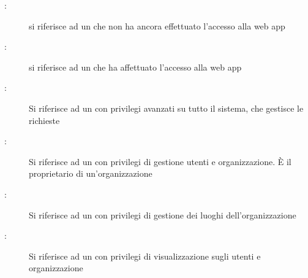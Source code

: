 \documentclass[../analisi-dei-requisiti.tex]{subfiles}
\begin{document}
\begin{description}
  \item[:] si riferisce ad un  che non ha ancora effettuato l'accesso alla web app
  \item[:] si riferisce ad un  che ha affettuato l'accesso alla web app
  \item[:] Si riferisce ad un  con privilegi avanzati su tutto il sistema, che gestisce le richieste
  \item[:] Si riferisce ad un  con privilegi di gestione utenti e organizzazione. È il proprietario di un'organizzazione
  \item[:] Si riferisce ad un  con privilegi di gestione dei luoghi dell'organizzazione
  \item[:] Si riferisce ad un  con privilegi di visualizzazione sugli utenti e organizzazione
\end{description}
\end{document}
